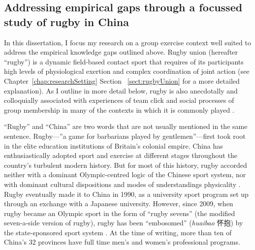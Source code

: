 \begin{CJK}{UTF8}{gbsn}

\section{Addressing empirical gaps through a focussed study of rugby in China}

In this dissertation, I focus my research on a group exercise context well suited to address the empirical knowledge gaps outlined above.  Rugby union (hereafter ``rugby'') is a dynamic field-based contact sport that requires of its participants high levels of physiological exertion and complex coordination of joint action (see Chapter~\ref{chap:researchSetting} Section ~\ref{sect:rugbyUnion} for a more detailed explanation). As I outline in more detail below, rugby is also anecdotally and colloquially associated with experiences of team click and social processes of group membership in many of the contexts in which it is commonly played \citep{Dunning2005}.

``Rugby'' and ``China'' are two words that are not usually mentioned in the same sentence.  Rugby---''a game for barbarians played by gentlemen''---first took root in the elite education institutions of Britain's colonial empire.  China has enthusiastically adopted sport and exercise at different stages throughout the country's turbulent modern history. But for most of this history, rugby accorded neither with a dominant Olympic-centred logic of the Chinese sport system, nor with dominant cultural dispositions and modes of understandings physicality \citep[derived from hundresds of years of continuous history of Confucian and Daoist traditions of thought, see][]{Morris2004}.  Rugby eventually made it to China in 1990, as a university sport program set up through an exchange with a Japanese university.  However, since 2009, when rugby became an Olympic sport in the form of ``rugby sevens'' (the modified seven-a-side version of rugby), rugby has been ``embosomed'' (\textit{huaibao} 怀抱) by the state-sponsored sport system \citep{Xu2010}.  At the time of writing, more than ten of China's 32 provinces have full time men's and women's professional programs.


\end{CJK}
